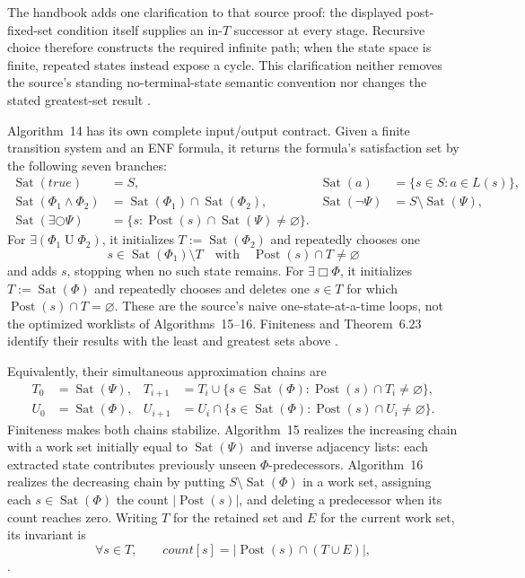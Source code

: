 The handbook adds one clarification to that source proof: the displayed
post-fixed-set condition itself supplies an in-\(T\) successor at every stage.
Recursive choice therefore constructs the required infinite path; when the
state space is finite, repeated states instead expose a cycle.  This
clarification neither removes the source's standing no-terminal-state
semantic convention nor changes the stated greatest-set result
\cite[thm.~6.23; pp.~343--345]{BaierKatoen2008}.

Algorithm~14 has its own complete input/output contract.  Given a finite
transition system and an ENF formula, it returns the formula's satisfaction set
by the following seven branches:
\[
\begin{aligned}
 \operatorname{Sat}(true)&=S,\qquad&
 \operatorname{Sat}(a)&=\{s\in S:a\in L(s)\},\\
 \operatorname{Sat}(\Phi_1\land\Phi_2)
   &=\operatorname{Sat}(\Phi_1)\cap\operatorname{Sat}(\Phi_2),&
 \operatorname{Sat}(\neg\Psi)&=S\setminus\operatorname{Sat}(\Psi),\\
 \operatorname{Sat}(\exists\bigcirc\Psi)
   &=\{s:\operatorname{Post}(s)\cap\operatorname{Sat}(\Psi)
             \ne\varnothing\}.&&
\end{aligned}
\]
For \(\exists(\Phi_1\mathbin{U}\Phi_2)\), it initializes
\(T:=\operatorname{Sat}(\Phi_2)\) and repeatedly chooses one
\[
 s\in\operatorname{Sat}(\Phi_1)\setminus T
 \quad\text{with}\quad
 \operatorname{Post}(s)\cap T\ne\varnothing
\]
and adds \(s\), stopping when no such state remains.  For
\(\exists\Box\Phi\), it initializes \(T:=\operatorname{Sat}(\Phi)\) and
repeatedly chooses and deletes one \(s\in T\) for which
\(\operatorname{Post}(s)\cap T=\varnothing\).  These are the source's naive
one-state-at-a-time loops, not the optimized worklists of Algorithms~15--16.
Finiteness and Theorem~6.23 identify their results with the least and greatest
sets above \cite[alg.~14; p.~348]{BaierKatoen2008}.

Equivalently, their simultaneous approximation chains are
\[
\begin{aligned}
 T_0&=\operatorname{Sat}(\Psi),&
 T_{i+1}&=T_i\cup
   \{s\in\operatorname{Sat}(\Phi):
        \operatorname{Post}(s)\cap T_i\ne\varnothing\},\\
 U_0&=\operatorname{Sat}(\Phi),&
 U_{i+1}&=U_i\cap
   \{s\in\operatorname{Sat}(\Phi):
        \operatorname{Post}(s)\cap U_i\ne\varnothing\}.
\end{aligned}
\]
Finiteness makes both chains stabilize.  Algorithm~15 realizes the increasing
chain with a work set initially equal to \(\operatorname{Sat}(\Psi)\) and
inverse adjacency lists: each extracted state contributes previously unseen
\(\Phi\)-predecessors.  Algorithm~16 realizes the decreasing chain by putting
\(S\setminus\operatorname{Sat}(\Phi)\) in a work set, assigning each
\(s\in\operatorname{Sat}(\Phi)\) the count
\(\lvert\operatorname{Post}(s)\rvert\), and deleting a predecessor when its
count reaches zero.  Writing \(T\) for the retained set and \(E\) for the
current work set, its invariant is
\[
 \forall s\in T,\qquad
 count[s]=\lvert\operatorname{Post}(s)\cap(T\cup E)\rvert,
\]
\cite[algs.~15--16; pp.~349--352]{BaierKatoen2008}.

